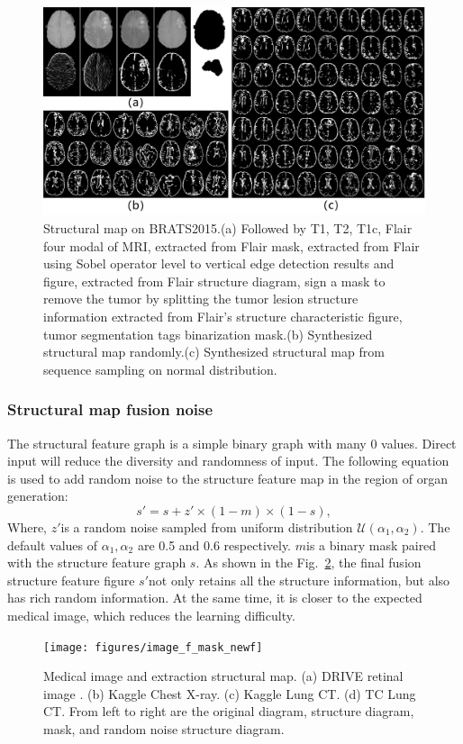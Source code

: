 \documentclass[runningheads]{llncs}
\begin{document}
\begin{figure}[thbp!]
	\centering
	\includegraphics[width=1\linewidth]{figures/brats_f}
	\caption{Structural map on BRATS2015.(a) Followed by T1, T2, T1c, Flair four modal of MRI, extracted from Flair mask, extracted from Flair using Sobel operator level to vertical edge detection results and figure, extracted from Flair structure diagram, sign a mask to remove the tumor by splitting the tumor lesion structure information extracted from Flair's structure characteristic figure, tumor segmentation tags binarization mask.(b) Synthesized structural map randomly.(c) Synthesized structural map from sequence sampling on normal distribution.}
	\label{generated_f}
\end{figure}

\subsubsection{Structural map fusion noise}
The structural feature graph is a simple binary graph with many 0 values. Direct input will reduce the diversity and randomness of input. The following equation is used to add random noise to the structure feature map in the region of organ generation:
\begin{equation}
s'=s+z'\times(1-m)\times(1-s),
\end{equation}
Where, $z'$is a random noise sampled from uniform distribution $\mathcal{U}(\alpha_1,\alpha_2)$. The default values of $\alpha_1,\alpha_2$ are 0.5 and 0.6 respectively. $m$is a binary mask paired with the structure feature graph $s$. As shown in the Fig.~\ref{image_and_f}, the final fusion structure feature figure $s'$not only retains all the structure information, but also has rich random information. At the same time, it is closer to the expected medical image, which reduces the learning difficulty.
\begin{figure}[thbp!]
	\centering
	\texttt{[image: figures/image\_f\_mask\_newf]}
	\caption{Medical image and extraction structural map. (a) DRIVE retinal image . (b) Kaggle Chest X-ray. (c) Kaggle Lung CT. (d) TC Lung CT. From left to right are the original diagram, structure diagram, mask, and random noise structure diagram.}
	\label{image_and_f}
\end{figure}
\end{document}
